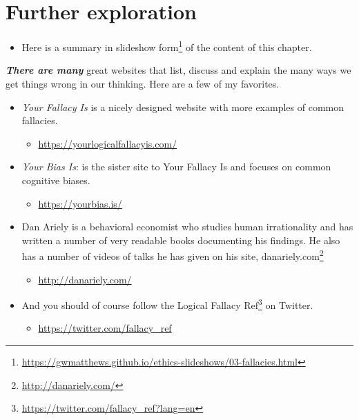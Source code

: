 \documentclass[12pt, openany]{book}
\providecommand{\tightlist}{%
  \setlength{\itemsep}{0pt}\setlength{\parskip}{0pt}}
\renewcommand{\href}[2]{#2\footnote{\url{#1}}}
\begin{document}
\hypertarget{further-exploration-2}{%
\section*{Further exploration}\label{further-exploration-2}}


\begin{itemize}
\tightlist
\item
  Here is a \href{https://gwmatthews.github.io/ethics-slideshows/03-fallacies.html}{summary in slideshow form} of the content of this chapter.
\end{itemize}

\textbf{\emph{There are many}} great websites that list, discuss and explain the many ways we get things wrong in our thinking. Here are a few of my favorites.

\begin{itemize}
\tightlist
\item
  \emph{Your Fallacy Is} is a nicely designed website with more examples of common fallacies.

  \begin{itemize}
  \tightlist
  \item
    \url{https://yourlogicalfallacyis.com/}
  \end{itemize}
\item
  \emph{Your Bias Is}: is the sister site to Your Fallacy Is and focuses on common cognitive biases.

  \begin{itemize}
  \tightlist
  \item
    \url{https://yourbias.is/}
  \end{itemize}
\item
  Dan Ariely is a behavioral economist who studies human irrationality and has written a number of very readable books documenting his findings. He also has a number of videos of talks he has given on his site, \href{http://danariely.com/}{danariely.com}

  \begin{itemize}
  \tightlist
  \item
    \url{http://danariely.com/}
  \end{itemize}
\item
  And you should of course follow the \href{https://twitter.com/fallacy_ref?lang=en}{Logical Fallacy Ref} on Twitter.

  \begin{itemize}
  \tightlist
  \item
    \url{https://twitter.com/fallacy_ref}
  \end{itemize}
\end{itemize}
\end{document}
